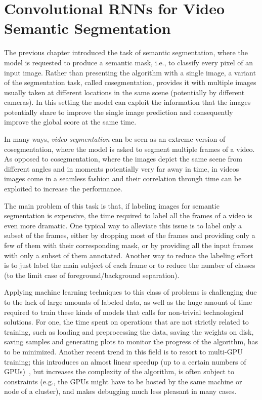 \chapter{Convolutional RNNs for Video Semantic Segmentation}\label{sec:video_segmentation}

The previous chapter introduced the task of semantic segmentation, where the
model is requested to produce a semantic mask, i.e., to classify every pixel of
an input image. Rather than presenting the algorithm with a single image, a
variant of the segmentation task, called cosegmentation, provides it with
multiple images usually taken at different locations in the same scene
(potentially by different cameras). In this setting the model can exploit the
information that the images potentially share to improve the single image
prediction and consequently improve the global score at the same time.

In many ways, \emph{video segmentation} can be seen as an extreme version of
cosegmentation, where the model is asked to segment multiple frames of a video.
As opposed to cosegmentation, where the images depict the same scene from
different angles and in moments potentially very far away in time, in videos
images come in a seamless fashion and their correlation through time can be
exploited to increase the performance.

The main problem of this task is that, if labeling images for semantic
segmentation is expensive, the time required to label all the frames of a
video is even more dramatic. One typical way to alleviate this issue is to
label only a subset of the frames, either by dropping most of the frames and
providing only a few of them with their corresponding mask, or by providing all
the input frames with only a subset of them annotated. Another way to reduce
the labeling effort is to just label the main subject of each frame or to
reduce the number of classes (to the limit case of foreground/background
separation).

Applying machine learning techniques to this class of problems is challenging
due to the lack of large amounts of labeled data, as well as the huge amount of
time required to train these kinds of models that calls for non-trivial
technological solutions. For one, the time spent on operations that are not
strictly related to training, such as loading and preprocessing the data,
saving the weights on disk, saving samples and generating plots to monitor the
progress of the algorithm, has to be minimized. Another recent trend in this
field is to resort to multi-GPU training; this introduces an almost linear
speedup (up to a certain numbers of GPUs)~\citep{theano2016short,ma2016theano},
but increases the complexity of the algorithm, is often subject to constraints
(e.g., the GPUs might have to be hosted by the same machine or node of a
cluster), and makes debugging much less pleasant in many cases.

